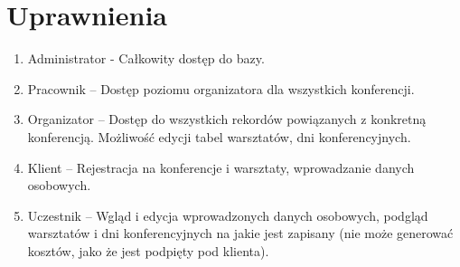 \documentclass{article}
\begin{document}
\newpage
\section{Uprawnienia}
    \begin{enumerate}
        \item Administrator - Całkowity dostęp do bazy.
        \item Pracownik – Dostęp poziomu organizatora dla wszystkich konferencji. 
        \item Organizator – Dostęp do wszystkich rekordów powiązanych z konkretną konferencją. Możliwość edycji tabel warsztatów, dni konferencyjnych.  
        \item Klient – Rejestracja na konferencje i warsztaty, wprowadzanie danych osobowych.
        \item Uczestnik – Wgląd  i edycja wprowadzonych danych osobowych, podgląd warsztatów  i dni konferencyjnych na jakie jest zapisany (nie może generować kosztów, jako że jest podpięty pod klienta). 
    \end{enumerate}
\end{document}
